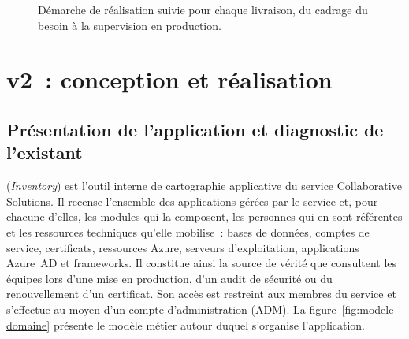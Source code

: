 \begin{figure}[H]
{%
  }
  \caption{Démarche de réalisation suivie pour chaque livraison, du cadrage du
    besoin à la supervision en production.}
  \label{fig:workflow}
\end{figure}

\section{\csbag v2~: conception et réalisation}
\label{sec:csbag-detail}

\subsection{Présentation de l'application et diagnostic de l'existant}
\label{sec:existant}

\csbag (\textit{Inventory}) est l'outil interne de cartographie applicative du
service Collaborative Solutions. Il recense l'ensemble des applications gérées
par le service et, pour chacune d'elles, les modules qui la composent, les
personnes qui en sont référentes et les ressources techniques qu'elle mobilise~:
bases de données, comptes de service, certificats, ressources Azure, serveurs
d'exploitation, applications Azure~AD et frameworks. Il constitue ainsi la
source de vérité que consultent les équipes lors d'une mise en production, d'un
audit de sécurité ou du renouvellement d'un certificat. Son accès est restreint
aux membres du service et s'effectue au moyen d'un compte d'administration
(ADM). La figure~\ref{fig:modele-domaine} présente le modèle métier autour
duquel s'organise l'application.

